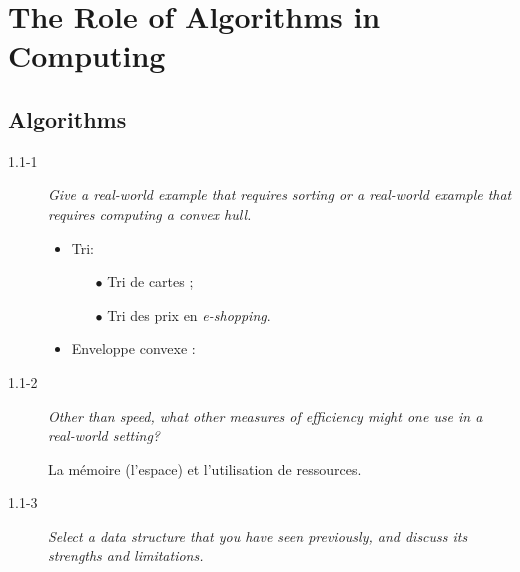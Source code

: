 \section{The Role of Algorithms in Computing}

\subsection{Algorithms}

\begin{description}
  \item[1.1-1] {\itshape Give a real-world example that requires sorting or a real-world example that requires computing a convex hull.}

    \begin{ex}
      \begin{itemize}
        \item Tri: 
          \begin{itemize}
            \item[$\bullet$] Tri de cartes ;
            \item[$\bullet$] Tri des prix en {\itshape e-shopping}.
          \end{itemize}
        \item Enveloppe convexe :  \cite{wiki:conv_hull}
      \end{itemize}
    \end{ex}

  \item[1.1-2] {\itshape Other than speed, what other measures of efficiency might one use in a real-world setting?}

    \begin{ex}
      La m\'emoire (l'espace) et l'utilisation de ressources.
    \end{ex}

  \item[1.1-3] {\itshape Select a data structure that you have seen previously, and discuss its strengths and limitations.}


\end{description}

